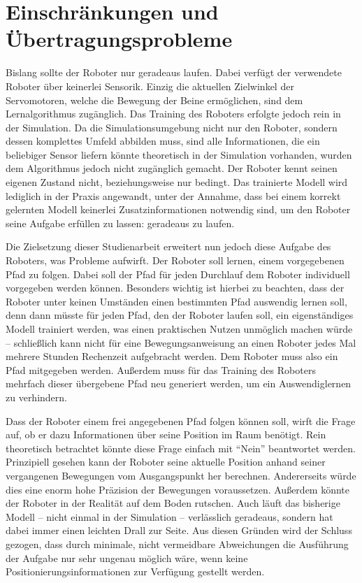 \section{Einschränkungen und Übertragungsprobleme}
\label{sec:probleme}
Bislang sollte der Roboter nur geradeaus laufen.
Dabei verfügt der verwendete Roboter über keinerlei Sensorik.
Einzig die aktuellen Zielwinkel der Servomotoren, welche die Bewegung der Beine ermöglichen, sind dem Lernalgorithmus zugänglich.
Das Training des Roboters erfolgte jedoch rein in der Simulation.
Da die Simulationsumgebung nicht nur den Roboter, sondern dessen komplettes Umfeld abbilden muss, sind alle Informationen, die ein beliebiger Sensor liefern könnte theoretisch in der Simulation vorhanden, wurden dem Algorithmus jedoch nicht zugänglich gemacht.
Der Roboter kennt seinen eigenen Zustand nicht, beziehungsweise nur bedingt.
Das trainierte Modell wird lediglich in der Praxis angewandt, unter der Annahme, dass bei einem korrekt gelernten Modell keinerlei Zusatzinformationen notwendig sind, um den Roboter seine Aufgabe erfüllen zu lassen: geradeaus zu laufen.

Die Zielsetzung dieser Studienarbeit erweitert nun jedoch diese Aufgabe des Roboters, was Probleme aufwirft.
Der Roboter soll lernen, einem vorgegebenen Pfad zu folgen.
Dabei soll der Pfad für jeden Durchlauf dem Roboter individuell vorgegeben werden können.
Besonders wichtig ist hierbei zu beachten, dass der Roboter unter keinen Umständen einen bestimmten Pfad auswendig lernen soll, denn dann müsste für jeden Pfad, den der Roboter laufen soll, ein eigenständiges Modell trainiert werden, was einen praktischen Nutzen unmöglich machen würde -- schließlich kann nicht für eine Bewegungsanweisung an einen Roboter jedes Mal mehrere Stunden Rechenzeit aufgebracht werden.
Dem Roboter muss also ein Pfad mitgegeben werden.
Außerdem muss für das Training des Roboters mehrfach dieser übergebene Pfad neu generiert werden, um ein Auswendiglernen zu verhindern.

Dass der Roboter einem frei angegebenen Pfad folgen können soll, wirft die Frage auf, ob er dazu Informationen über seine Position im Raum benötigt.
Rein theoretisch betrachtet könnte diese Frage einfach mit \enquote{Nein} beantwortet werden.
Prinzipiell gesehen kann der Roboter seine aktuelle Position anhand seiner vergangenen Bewegungen vom Ausgangspunkt her berechnen.
Andererseits würde dies eine enorm hohe Präzision der Bewegungen voraussetzen.
Außerdem könnte der Roboter in der Realität auf dem Boden rutschen.
Auch läuft das bisherige Modell -- nicht einmal in der Simulation -- verlässlich geradeaus, sondern hat dabei immer einen leichten Drall zur Seite.
Aus diesen Gründen wird der Schluss gezogen, dass durch minimale, nicht vermeidbare Abweichungen die Ausführung der Aufgabe nur sehr ungenau möglich wäre, wenn keine Positionierungsinformationen zur Verfügung gestellt werden.

